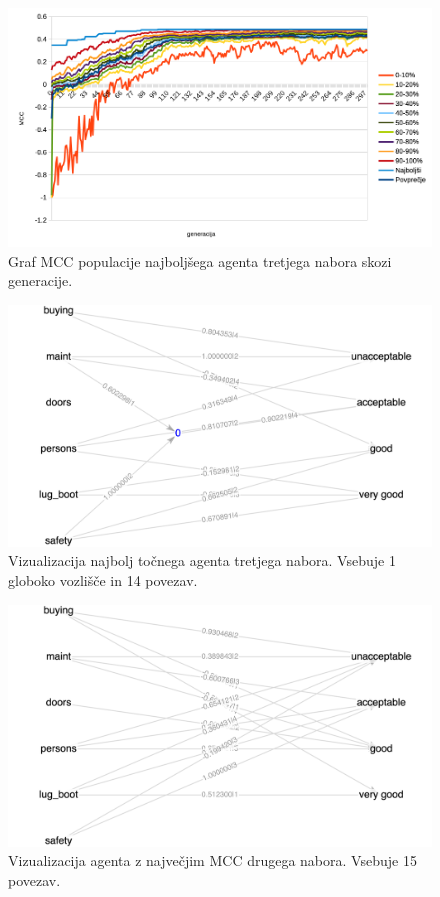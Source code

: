 \begin{figure}[H]
    \begin{center}
        \includegraphics[width=13cm]{car/3/mcc}
    \end{center}
    \caption{Graf MCC populacije najboljšega agenta tretjega nabora skozi generacije.}
    \label{fig:car_mcc_3}
\end{figure}

\begin{figure}[H]
    \begin{center}
        \includegraphics[width=13cm]{car/3/acc_g}
    \end{center}
    \caption{Vizualizacija najbolj točnega agenta tretjega nabora. Vsebuje 1 globoko vozlišče in 14 povezav.}
    \label{fig:car_acc_3_g}
\end{figure}

\begin{figure}[H]
    \begin{center}
        \includegraphics[width=13cm]{car/3/mcc_g}
    \end{center}
    \caption{Vizualizacija agenta z največjim MCC drugega nabora. Vsebuje 15 povezav.}
    \label{fig:car_mcc_3_g}
\end{figure}
